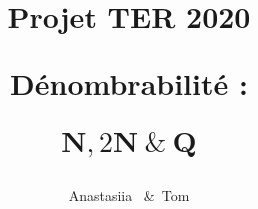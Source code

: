 \newcommand{\deffunct}[5]{%
\begin{align*}%
      #1 \colon & #2 \to #3\\
       &#4\xmapsto{\hphantom{#1}} #5
\end{align*}%
}


\newcommand*{\NN}{\mathbf{N}}
\newcommand*{\ZZ}{\mathbf{Z}}
\newcommand*{\QQ}{\mathbf{Q}}
\newcommand{\HRule}{\rule{\paperwidth}{0.5mm}} %
\newcommand*{\theuniversity}{Université de Toulon}
\newcommand*{\theyearname}{Licence de Mathématiques, parcours mathématiques, 
2\ieme~année}
\newcommand*{\thesupervisor}{Joachim \bsc{Asch}}
\author{Anastasiia ~\&~Tom }
\title{Projet TER 2020\par
            Dénombrabilité : \par $\NN,2\NN \ \& \ \QQ$\par}


\setulmargins{*}{*}{*}
\setheaderspaces{*}{*}{*}
\setlrmargins{*}{*}{*}
\setheadfoot{\headheight+0.314pt}{\footskip}
\checkandfixthelayout[nearest]
\renewcommand*{\sideparfont}{\itshape\footnotesize}
\renewcommand*{\sideparform}{\ifmemtortm\RaggedRight\else\RaggedLeft\fi}


\renewcommand{\cftpartaftersnum}{.}
\renewcommand{\cftchapteraftersnum}{.}
\renewcommand{\cftpartdotsep}{\cftdotsep}
\renewcommand{\cftchapterdotsep}{\cftdotsep}%
\addto\captionsfrench{\renewcommand{\appendixpagename}{Annexes}}
\addto\captionsfrench{\renewcommand{\appendixtocname}{Annexes}}

\setmainfont{CMU Serif}
\setsansfont{CMU Sans Serif}
\setmonofont{CMU Typewriter Text}

\DeclareMathOperator{\Card}{Card} %
